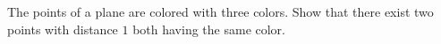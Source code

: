 The points of a plane are colored with three colors. Show that there exist two points with distance $1$ both having the same color.
